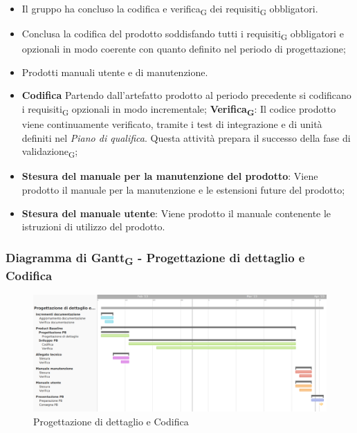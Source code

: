 \:
\begin{itemize}
	\item Il gruppo ha concluso la codifica e verifica\textsubscript{G} dei requisiti\textsubscript{G} obbligatori.
\end{itemize}

\:
\begin{itemize}
	\item Conclusa la codifica del prodotto soddisfando tutti i requisiti\textsubscript{G} obbligatori e opzionali in modo coerente con quanto definito nel periodo di progettazione;
	\item Prodotti manuali utente e di manutenzione.
\end{itemize}

\:
\begin{itemize}
	\item \textbf{Codifica} Partendo dall'artefatto prodotto al periodo precedente si codificano i requisiti\textsubscript{G} opzionali in modo incrementale;
	\subitem \textbf{Verifica\textsubscript{G}}: Il codice prodotto viene continuamente verificato, tramite i test di integrazione e di unità definiti nel \textit{Piano di qualifica}. Questa attività prepara il successo della fase di validazione\textsubscript{G};
	\item \textbf{Stesura del manuale per la manutenzione del prodotto}: Viene prodotto il manuale per la manutenzione e le estensioni future del prodotto;
	\item \textbf{Stesura del manuale utente}: Viene prodotto il manuale contenente le istruzioni di utilizzo del prodotto.
\end{itemize}
\subsubsection{Diagramma di Gantt\textsubscript{G} - Progettazione di dettaglio e Codifica}

\begin{figure}[H]
\centering
\includegraphics[width=\textwidth]{img/4_codifica.png}
\caption{Progettazione di dettaglio e Codifica}
\end{figure}

